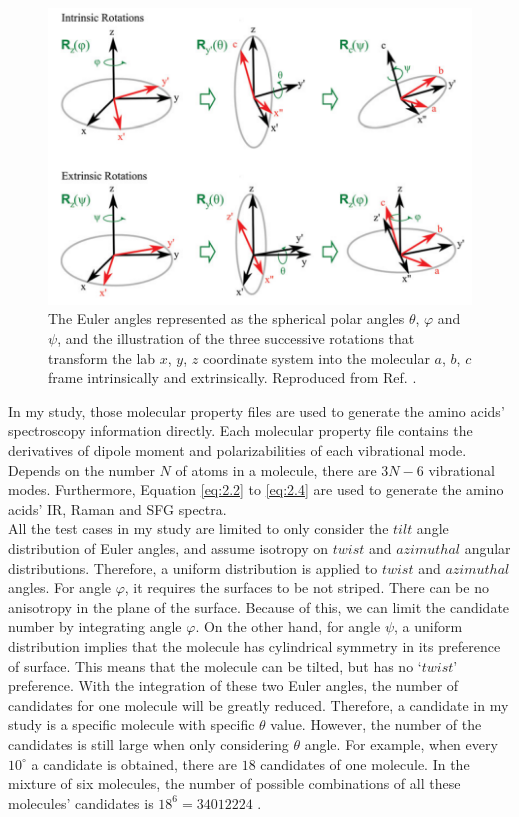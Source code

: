 \begin{figure}[!ht] 
\centering
\includegraphics[scale=0.5]{Figures/Euler_angles_represented_as_the_spherical_polar_angles.png} 
\caption{The Euler angles represented as the spherical polar angles $\theta$, $\varphi$ and $\psi$, and the illustration of the three successive rotations that transform the lab $x$, $y$, $z$ coordinate system into the molecular $a$, $b$, $c$ frame intrinsically and extrinsically. Reproduced from Ref. . }
\label{fig:2.1}
\end{figure}

In my study, those molecular property files are used to generate the amino acids' spectroscopy information directly. Each molecular property file contains the derivatives of dipole moment and polarizabilities of each vibrational mode. Depends on the number $N$ of atoms in a molecule, there are $3N-6$ vibrational modes. Furthermore, Equation \ref{eq:2.2} to \ref{eq:2.4} are used to generate the amino acids' IR, Raman and SFG spectra. \\

All the test cases in my study are limited to only consider the $tilt$ angle distribution of Euler angles, and assume isotropy on $twist$ and $azimuthal$ angular distributions. Therefore,  a uniform distribution is applied to $twist$ and $azimuthal$ angles. For angle $\varphi$, it requires the surfaces to be not striped. There can be no anisotropy in the plane of the surface. Because of this, we can limit the candidate number by integrating angle $\varphi$. On the other hand, for angle $\psi$, a uniform distribution implies that the molecule has cylindrical symmetry in its preference of surface. This means that the molecule can be tilted, but has no `$twist$' preference. With the integration of these two Euler angles, the number of candidates for one molecule will be greatly reduced. Therefore, a candidate in my study is a specific molecule with specific $\theta$ value. However, the number of the candidates is still large when only considering $\theta$ angle. For example, when every $10^{{\circ}}$ a candidate is obtained, there are $18$ candidates of one molecule. In the mixture of six molecules, the number of possible combinations of all these molecules' candidates is $18^{6} = 34012224$ . \\

